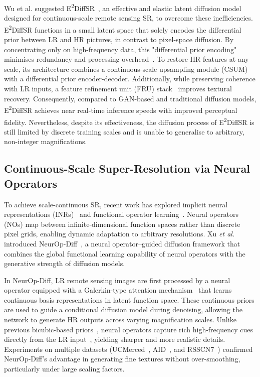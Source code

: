 \documentclass[conference]{IEEEtran}
\begin{document}
Wu et al. suggested E\textsuperscript{2}DiffSR~\cite{e2diffsr}, an effective and elastic latent diffusion model designed for continuous-scale remote sensing SR, to overcome these inefficiencies.  E\textsuperscript{2}DiffSR functions in a small latent space that solely encodes the differential prior between LR and HR pictures, in contrast to pixel-space diffusion.  By concentrating only on high-frequency data, this "differential prior encoding" minimises redundancy and processing overhead~\cite{e2diffsr}. 
 To restore HR features at any scale, its architecture combines a continuous-scale upsampling module (CSUM)~\cite{wang2023csum} with a differential prior encoder-decoder.  Additionally, while preserving coherence with LR inputs, a feature refinement unit (FRU) stack~\cite{li2022fru} improves textural recovery. 
Consequently, compared to GAN-based and traditional diffusion models, E\textsuperscript{2}DiffSR achieves near real-time inference speeds with improved perceptual fidelity. 
 Nevertheless, despite its effectiveness, the diffusion process of E\textsuperscript{2}DiffSR is still limited by discrete training scales and is unable to generalise to arbitrary, non-integer magnifications.

\subsection{Continuous-Scale Super-Resolution via Neural Operators}

To achieve scale-continuous SR, recent work has explored implicit neural representations (INRs)~\cite{sitzmann2020implicit} and functional operator learning~\cite{li2020fourier}. Neural operators (NOs) map between infinite-dimensional function spaces rather than discrete pixel grids, enabling dynamic adaptation to arbitrary resolutions. Xu \textit{et al.} introduced NeurOp-Diff~\cite{neurOpDiff}, a neural operator–guided diffusion framework that combines the global functional learning capability of neural operators with the generative strength of diffusion models.

In NeurOp-Diff, LR remote sensing images are first processed by a neural operator equipped with a Galerkin-type attention mechanism~\cite{kovachki2021neural} that learns continuous basis representations in latent function space. These continuous priors are used to guide a conditional diffusion model during denoising, allowing the network to generate HR outputs across varying magnification scales. Unlike previous bicubic-based priors~\cite{dong2015image}, neural operators capture rich high-frequency cues directly from the LR input~\cite{li2020fourier}, yielding sharper and more realistic details. Experiments on multiple datasets (UCMerced~\cite{yang2010ucmerced}, AID~\cite{xia2017aid}, and RSSCN7~\cite{zou2015rsscn7}) confirmed NeurOp-Diff’s advantage in generating fine textures without over-smoothing, particularly under large scaling factors.
\end{document}
